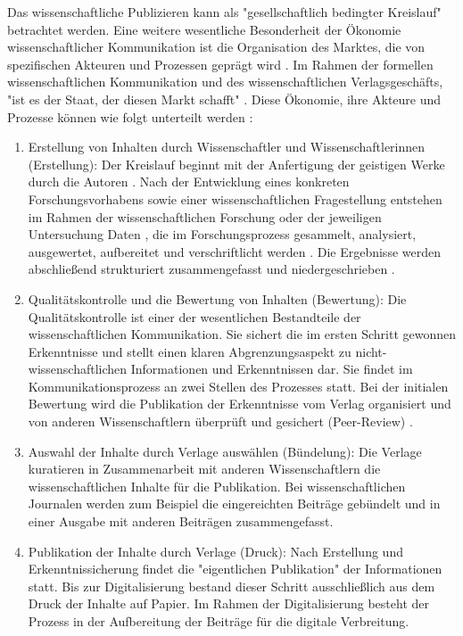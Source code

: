 \begin{enumerate}
\begin{end}
Das wissenschaftliche Publizieren kann als "gesellschaftlich bedingter Kreislauf" \cite{schirmbacher_2009_wisspub} betrachtet werden. Eine weitere wesentliche Besonderheit der Ökonomie wissenschaftlicher Kommunikation ist die Organisation des Marktes, die von spezifischen Akteuren und Prozessen geprägt wird \cite{Hess_2006}. Im Rahmen der formellen wissenschaftlichen Kommunikation und des wissenschaftlichen Verlagsgeschäfts, "ist es der Staat, der diesen Markt schafft" \cite{Hirschi_2015_buch_oa}. Diese Ökonomie, ihre Akteure und Prozesse können wie folgt unterteilt werden \cite{cite:11b} \cite{Hess_2006}:
\begin{enumerate}
\item Erstellung von Inhalten durch Wissenschaftler und Wissenschaftlerinnen (Erstellung): Der Kreislauf beginnt mit der Anfertigung der geistigen Werke durch die Autoren \cite{schirmbacher_2009_wisspub}. Nach der Entwicklung eines konkreten Forschungsvorhabens sowie einer wissenschaftlichen Fragestellung entstehen im Rahmen der wissenschaftlichen Forschung oder der jeweiligen Untersuchung Daten \cite{cite:11c}, die im Forschungsprozess gesammelt, analysiert, ausgewertet, aufbereitet und verschriftlicht werden \cite{cite:11d}. Die Ergebnisse werden abschließend strukturiert zusammengefasst und niedergeschrieben \cite{Hess_2006}.
\item Qualitätskontrolle und die Bewertung von Inhalten (Bewertung):
Die Qualitätskontrolle ist einer der wesentlichen Bestandteile der wissenschaftlichen Kommunikation. Sie sichert die im ersten Schritt gewonnen Erkenntnisse \cite{cite:11e} und stellt einen klaren Abgrenzungsaspekt zu nicht-wissenschaftlichen Informationen und Erkenntnissen dar\cite{cite:11f}. Sie findet im Kommunikationsprozess an zwei Stellen des Prozesses statt. Bei der initialen Bewertung wird die Publikation der Erkenntnisse vom Verlag organisiert \cite{schirmbacher_2009_wisspub} und von anderen Wissenschaftlern überprüft und gesichert (Peer-Review) \cite{Hess_2006}.
\item Auswahl der Inhalte durch Verlage auswählen (Bündelung):
Die Verlage kuratieren in Zusammenarbeit mit anderen Wissenschaftlern die wissenschaftlichen Inhalte für die Publikation. Bei wissenschaftlichen Journalen werden zum Beispiel die eingereichten Beiträge gebündelt und in einer Ausgabe mit anderen Beiträgen zusammengefasst.
\item Publikation der Inhalte durch Verlage (Druck):
Nach Erstellung und Erkenntnissicherung findet die "eigentlichen Publikation" \cite{schirmbacher_2009_wisspub} der Informationen statt. Bis zur Digitalisierung bestand dieser Schritt ausschließlich aus dem Druck der Inhalte auf Papier.\cite{cite:11h} Im Rahmen der Digitalisierung besteht der Prozess in der Aufbereitung der Beiträge für die digitale Verbreitung.

\end{enumerate}
\end{end}
\end{enumerate}
